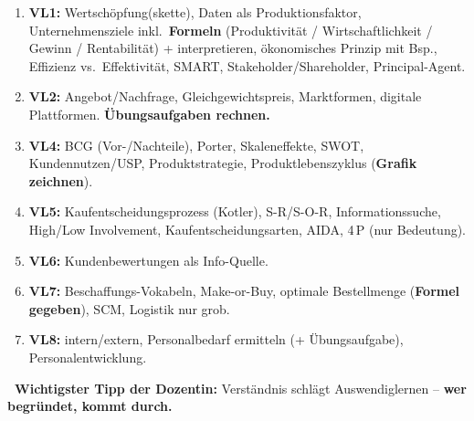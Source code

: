 \documentclass[11pt,a4paper]{article}
\begin{document}
\begin{enumerate}[leftmargin=*,itemsep=2pt]
\item \textbf{VL1:} Wertschöpfung(skette), Daten als Produktionsfaktor, Unternehmensziele inkl.\ \textbf{Formeln} (Produktivität / Wirtschaftlichkeit / Gewinn / Rentabilität) + interpretieren, ökonomisches Prinzip mit Bsp., Effizienz vs.\ Effektivität, SMART, Stakeholder/Shareholder, Principal-Agent.
\item \textbf{VL2:} Angebot/Nachfrage, Gleichgewichtspreis, Marktformen, digitale Plattformen. \textbf{Übungsaufgaben rechnen.}
\item \textbf{VL4:} BCG (Vor-/Nachteile), Porter, Skaleneffekte, SWOT, Kundennutzen/USP, Produktstrategie, Produktlebenszyklus (\textbf{Grafik zeichnen}).
\item \textbf{VL5:} Kaufentscheidungsprozess (Kotler), S-R/S-O-R, Informationssuche, High/Low Involvement, Kaufentscheidungsarten, AIDA, 4\,P (nur Bedeutung).
\item \textbf{VL6:} Kundenbewertungen als Info-Quelle.
\item \textbf{VL7:} Beschaffungs-Vokabeln, Make-or-Buy, optimale Bestellmenge (\textbf{Formel gegeben}), SCM, Logistik nur grob.
\item \textbf{VL8:} intern/extern, Personalbedarf ermitteln (+ Übungsaufgabe), Personalentwicklung.
\end{enumerate}

\begin{tcolorbox}[colback=jagruen!8,colframe=jagruen,boxrule=0.8pt,arc=2pt]
\textbf{~Wichtigster Tipp der Dozentin:} Verständnis schlägt Auswendiglernen --
\textbf{wer begründet, kommt durch.}
\end{tcolorbox}
\end{document}
